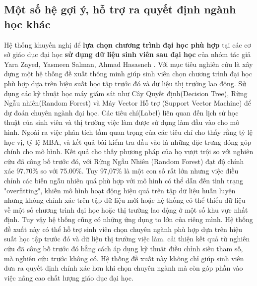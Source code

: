 \subsection{Một số hệ gợi ý, hỗ trợ ra quyết định ngành học khác}
Hệ thống khuyến nghị để \textbf{lựa chọn chương trình đại học phù hợp} tại các cơ sở giáo dục đại học \textbf{sử dụng dữ liệu sinh viên sau đại học} của nhóm tác giả Yara Zayed, Yasmeen Salman, Ahmad Hasasneh \cite{yara}. Với mục tiêu nghiên cứu là  xây dựng một hệ thống đề xuất thông minh giúp sinh viên chọn chương trình đại học phù hợp dựa trên hiệu suất học tập trước đó và dữ liệu thị trường lao động. Sử dụng các kỹ thuật học máy giám sát như Cây Quyết định(Decision Tree), Rừng Ngẫu nhiên(Random Forest) và Máy Vector Hỗ trợ (Support Vector Machine) để dự đoán chuyên ngành đại học. Các tiêu chí(Label) liên quan đến lịch sử học thuật của sinh viên và thị trường việc làm được sử dụng làm đầu vào cho mô hình. Ngoài ra việc phân tích tầm quan trọng của các tiêu chí cho thấy rằng tỷ lệ học vị, tỷ lệ MBA, và kết quả bài kiểm tra đầu vào là những đặc trưng đóng góp chính cho mô hình. Kết quả cho thấy phương pháp của họ vượt trội so với nghiên cứu đã công bố trước đó, với Rừng Ngẫu Nhiên (Random Forest) đạt độ chính xác 97.70\% so với 75.00\%. Tuy 97,07\% là một con số rất lớn nhưng việc điều chỉnh các biến ngẫu nhiên quá phù hợp với mô hình có thể dẫn đến tình trạng "overfitting", khiến mô hình hoạt động hiệu quả trên tập dữ liệu huấn luyện nhưng không chính xác trên tập dữ liệu mới hoặc hệ thống có thể thiếu dữ liệu về một số chương trình đại học hoặc thị trường lao động ở một số khu vực nhất định. Tuy vậy hệ thống cũng có những ứng dụng to lớn của riêng mình. Hệ thống đề xuất này có thể hỗ trợ sinh viên chọn chuyên ngành phù hợp dựa trên hiệu suất học tập trước đó và dữ liệu thị trường việc làm. cải thiện kết quả từ nghiên cứu đã công bố trước đó bằng cách áp dụng kỹ thuật điều chỉnh siêu tham số, mà nghiên cứu trước không có. Hệ thống đề xuất này không chỉ giúp sinh viên đưa ra quyết định chính xác hơn khi chọn chuyên ngành mà còn góp phần vào việc nâng cao chất lượng giáo dục đại học.

